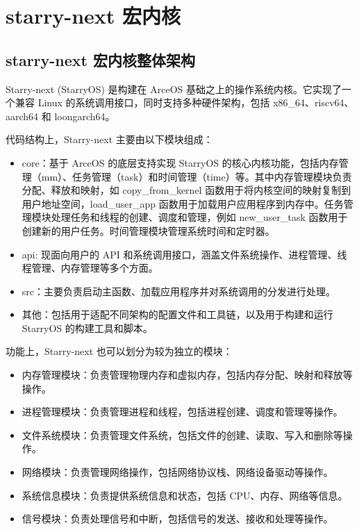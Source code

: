 
\chapter{starry-next 宏内核}

\section{starry-next 宏内核整体架构}

Starry-next (StarryOS) 是构建在 ArceOS 基础之上的操作系统内核。它实现了一个兼容 Linux 的系统调用接口，同时支持多种硬件架构，包括 x86\_64、riscv64、aarch64 和 loongarch64。

代码结构上，Starry-next 主要由以下模块组成：

\begin{itemize}
\item core：基于 ArceOS 的底层支持实现 StarryOS 的核心内核功能，包括内存管理（mm）、任务管理（task）和时间管理（time）等。其中内存管理模块负责分配、释放和映射，如 copy\_from\_kernel 函数用于将内核空间的映射复制到用户地址空间，load\_user\_app 函数用于加载用户应用程序到内存中。任务管理模块处理任务和线程的创建、调度和管理，例如 new\_user\_task 函数用于创建新的用户任务。时间管理模块管理系统时间和定时器。
\item api: 现面向用户的 API 和系统调用接口，涵盖文件系统操作、进程管理、线程管理、内存管理等多个方面。
\item src：主要负责启动主函数、加载应用程序并对系统调用的分发进行处理。
\item 其他：包括用于适配不同架构的配置文件和工具链，以及用于构建和运行 StarryOS 的构建工具和脚本。
\end{itemize}

功能上，Starry-next 也可以划分为较为独立的模块：

\begin{itemize}
\item 内存管理模块：负责管理物理内存和虚拟内存，包括内存分配、映射和释放等操作。
\item 进程管理模块：负责管理进程和线程，包括进程创建、调度和管理等操作。
\item 文件系统模块：负责管理文件系统，包括文件的创建、读取、写入和删除等操作。
\item 网络模块：负责管理网络操作，包括网络协议栈、网络设备驱动等操作。
\item 系统信息模块：负责提供系统信息和状态，包括 CPU、内存、网络等信息。
\item 信号模块：负责处理信号和中断，包括信号的发送、接收和处理等操作。
\end{itemize}

